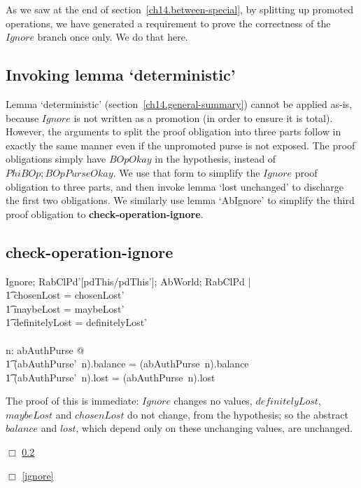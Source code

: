 As we saw at the end of section~\ref{ch14.between-special}, by
splitting up promoted operations, we have generated a requirement to
prove the correctness of the $Ignore$ branch once only.  We do that
here.
\subsection{Invoking lemma `deterministic'}
Lemma `deterministic' (section~\ref{ch14.general-summary}) cannot be
applied as-is, because $Ignore$ is not written as a promotion (in
order to ensure it is total).  However, the arguments to split the
proof obligation into three parts follow in exactly the same manner
even if the unpromoted purse is not exposed.  The proof obligations
simply have $BOpOkay$ in the hypothesis, instead of $PhiBOp ;
BOpPurseOkay$.  We use that form to simplify the $Ignore$ proof
obligation to three parts, and then invoke lemma `lost unchanged' to
discharge the first two obligations.  We similarly use lemma
`AbIgnore' to simplify the third proof obligation to {\bf
  check-operation-ignore}.

\subsection{check-operation-ignore}
\label{ignore-ignore-check-operation}
\begin{gzed}
  Ignore; RabClPd'[pdThis/pdThis']; AbWorld; RabClPd |
  \\ %
  \t1 chosenLost = chosenLost'
  \\ %
  \t1 \land maybeLost = maybeLost'
  \\ %
  \t1 \land definitelyLost = definitelyLost'
  \\ %
  \shows
  \\ %
  \forall n: \dom abAuthPurse @
  \\ %
  \t1 (abAuthPurse'~n).balance = (abAuthPurse~n).balance
  \\ %
  \t1 \land (abAuthPurse'~n).lost = (abAuthPurse~n).lost
\end{gzed}
The proof of this is immediate: $Ignore$ changes no values,
$definitelyLost$, $maybeLost$ and $chosenLost$ do not change,
from the hypothesis; so the abstract $balance$ and $lost$, which
depend only on these unchanging values, are unchanged.

$\Box$ \ref{ignore-ignore-check-operation}

$\Box$ \ref{ignore}
